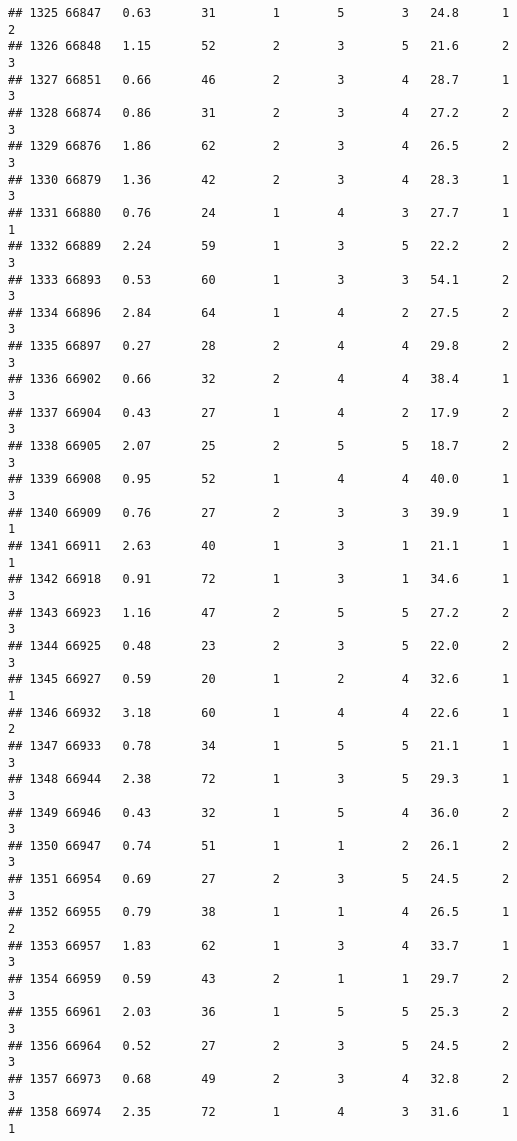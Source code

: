 \documentclass[
]{article}
\begin{document}
\begin{verbatim}
## 1325 66847   0.63       31        1        5        3   24.8      1      2
## 1326 66848   1.15       52        2        3        5   21.6      2      3
## 1327 66851   0.66       46        2        3        4   28.7      1      3
## 1328 66874   0.86       31        2        3        4   27.2      2      3
## 1329 66876   1.86       62        2        3        4   26.5      2      3
## 1330 66879   1.36       42        2        3        4   28.3      1      3
## 1331 66880   0.76       24        1        4        3   27.7      1      1
## 1332 66889   2.24       59        1        3        5   22.2      2      3
## 1333 66893   0.53       60        1        3        3   54.1      2      3
## 1334 66896   2.84       64        1        4        2   27.5      2      3
## 1335 66897   0.27       28        2        4        4   29.8      2      3
## 1336 66902   0.66       32        2        4        4   38.4      1      3
## 1337 66904   0.43       27        1        4        2   17.9      2      3
## 1338 66905   2.07       25        2        5        5   18.7      2      3
## 1339 66908   0.95       52        1        4        4   40.0      1      3
## 1340 66909   0.76       27        2        3        3   39.9      1      1
## 1341 66911   2.63       40        1        3        1   21.1      1      1
## 1342 66918   0.91       72        1        3        1   34.6      1      3
## 1343 66923   1.16       47        2        5        5   27.2      2      3
## 1344 66925   0.48       23        2        3        5   22.0      2      3
## 1345 66927   0.59       20        1        2        4   32.6      1      1
## 1346 66932   3.18       60        1        4        4   22.6      1      2
## 1347 66933   0.78       34        1        5        5   21.1      1      3
## 1348 66944   2.38       72        1        3        5   29.3      1      3
## 1349 66946   0.43       32        1        5        4   36.0      2      3
## 1350 66947   0.74       51        1        1        2   26.1      2      3
## 1351 66954   0.69       27        2        3        5   24.5      2      3
## 1352 66955   0.79       38        1        1        4   26.5      1      2
## 1353 66957   1.83       62        1        3        4   33.7      1      3
## 1354 66959   0.59       43        2        1        1   29.7      2      3
## 1355 66961   2.03       36        1        5        5   25.3      2      3
## 1356 66964   0.52       27        2        3        5   24.5      2      3
## 1357 66973   0.68       49        2        3        4   32.8      2      3
## 1358 66974   2.35       72        1        4        3   31.6      1      1

\end{verbatim}
\end{document}
